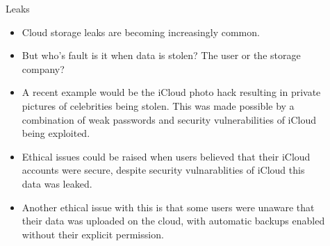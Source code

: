 \documentclass[final]{beamer}
\newlength{\sepwid}
\newlength{\onecolwid}
\newlength{\twocolwid}
\begin{document}
\begin{frame}[t]
\begin{columns}[t]
\begin{column}{\onecolwid}
\begin{block}{Leaks}
\begin{itemize}
\item Cloud storage leaks are becoming increasingly common.
\item But who's fault is it when data is stolen? The user or the storage company?
\item A recent example would be the iCloud photo hack resulting in private pictures of celebrities being stolen. This was made possible by a combination of weak passwords and security vulnerabilities of iCloud being exploited. 
\item Ethical issues could be raised when users believed that their iCloud accounts were secure, despite security vulnarablities of iCloud this data was leaked. 
\item Another ethical issue with this is that some users were unaware that their data was uploaded on the cloud\cite{iCloud}, with automatic backups enabled without their explicit permission.
\end{itemize}

\end{block}





\end{column} %

\begin{column}{\sepwid}\end{column} %

\begin{column}{\twocolwid} %

\begin{columns}[t,totalwidth=\twocolwid] %

\begin{column}{\onecolwid}\vspace{-.6in} %



\end{column}
\end{columns}
\end{column}
\end{columns}
\end{frame}
\end{document}
